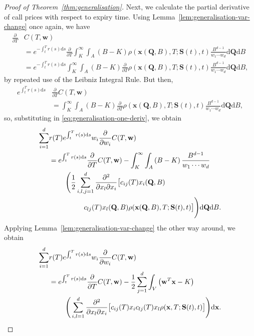 \documentclass[english]{article}
\numberwithin{equation}{section}
\numberwithin{figure}{section}
\theoremstyle{bolddescit}
\theoremstyle{definition}
\theoremstyle{definition}
\theoremstyle{plain}
\theoremstyle{plain}
\theoremstyle{bolddesc}
\theoremstyle{plain}
\theoremstyle{remark}
\begin{document}
\begin{proof}[Proof of Theorem~\ref{thm:generalisation}]
  Next, we calculate the partial derivative of call prices with respect to expiry time. Using Lemma~\ref{lem:generalisation-var-change} once again, we have
  \begin{align*}
    \frac{\partial}{\partial T} &C(T,\mathbf{w})\\
    &= e^{-\int_t^T r(s) \mathrm{d}s} \frac{\partial}{\partial T}\int_K^\infty \int_A \left(B - K\right) \rho(\mathbf{x}(\mathbf{Q},B),T;\mathbf{S}(t),t) \frac{B^{d-1}}{w_1 \cdots w_d} \mathrm{d}\mathbf{Q} \mathrm{d}B\\
    &= e^{-\int_t^T r(s) \mathrm{d}s} \int_K^\infty \int_A \left(B - K\right) \frac{\partial}{\partial T}\rho(\mathbf{x}(\mathbf{Q},B),T;\mathbf{S}(t),t) \frac{B^{d-1}}{w_1 \cdots w_d} \mathrm{d}\mathbf{Q} \mathrm{d}B,
  \end{align*}
  by repeated use of the Leibniz Integral Rule. But then,
  \begin{align*}
    e^{\int_t^T r(s) \mathrm{d}s} &\frac{\partial}{\partial T} C(T,\mathbf{w})\\
    &= \int_K^\infty \int_A \left(B - K\right) \frac{\partial}{\partial T}\rho(\mathbf{x}(\mathbf{Q},B),T;\mathbf{S}(t),t) \frac{B^{d-1}}{w_1 \cdots w_d} \mathrm{d}\mathbf{Q} \mathrm{d}B,
  \end{align*}
  so, substituting in \eqref{eq:generalisation-one-deriv}, we obtain
  \begin{align*}
    \sum_{i=1}^{d} &r(T) e^{\int_t^T r(s) \mathrm{d}s} w_i \frac{\partial}{\partial w_i} C(T,\mathbf{w})\notag\\
    &= e^{\int_t^T r(s) \mathrm{d}s} \frac{\partial}{\partial T} C(T,\mathbf{w}) - \int_K^\infty \int_A \left(B - K\right) \frac{B^{d-1}}{w_1 \cdots w_d}\notag\\
      &\ \ \ \ \ \ \ \Bigg( \frac{1}{2} \sum_{i,l,j=1}^{d} \frac{\partial^2}{\partial x_l \partial x_i}\big[c_{ij}(T) x_i(\mathbf{Q},B) \notag\\
      &\ \ \ \ \ \ \ \ \ \ \ \ \ \ \ c_{lj}(T) x_l(\mathbf{Q},B) \rho(\mathbf{x}(\mathbf{Q},B),T;\mathbf{S}(t),t)\big] \Bigg) \mathrm{d}\mathbf{Q} \mathrm{d}B.
  \end{align*}
  Applying Lemma~\ref{lem:generalisation-var-change} the other way around, we obtain
  \begin{align}
    \sum_{i=1}^{d} &r(T) e^{\int_t^T r(s) \mathrm{d}s} w_i \frac{\partial}{\partial w_i} C(T,\mathbf{w})\notag\\
    &= e^{\int_t^T r(s) \mathrm{d}s} \frac{\partial}{\partial T} C(T,\mathbf{w}) - \frac{1}{2} \sum_{j=1}^{d} \int_V \left(\mathbf{w}^T \mathbf{x} - K\right) \notag\\
      &\ \ \ \ \ \ \ \Bigg( \sum_{i,l=1}^{d} \frac{\partial^2}{\partial x_l \partial x_i}\big[c_{ij}(T) x_i c_{lj}(T) x_l \rho(\mathbf{x},T;\mathbf{S}(t),t)\big] \Bigg) \mathrm{d}\mathbf{x}. \label{eq:generalisation-two-derivs}
  \end{align}


\end{proof}
\end{document}
